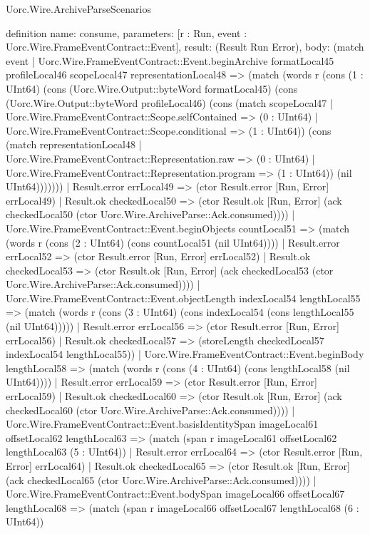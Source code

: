 \begin{lexlean}{Uorc.Wire.ArchiveParseScenarios}
\begin{semanticmodule}
definition{
  name: consume,
  parameters: [r : Run, event : Uorc.Wire.FrameEventContract::Event],
  result: (Result Run Error),
  body: (match event
    | Uorc.Wire.FrameEventContract::Event.beginArchive formatLocal45 profileLocal46 scopeLocal47 representationLocal48 => (match (words r (cons (1 : UInt64) (cons (Uorc.Wire.Output::byteWord formatLocal45) (cons (Uorc.Wire.Output::byteWord profileLocal46) (cons (match scopeLocal47
        | Uorc.Wire.FrameEventContract::Scope.selfContained => (0 : UInt64)
        | Uorc.Wire.FrameEventContract::Scope.conditional => (1 : UInt64)) (cons (match representationLocal48
        | Uorc.Wire.FrameEventContract::Representation.raw => (0 : UInt64)
        | Uorc.Wire.FrameEventContract::Representation.program => (1 : UInt64)) (nil UInt64)))))))
      | Result.error errLocal49 => (ctor Result.error [Run, Error] errLocal49)
      | Result.ok checkedLocal50 => (ctor Result.ok [Run, Error] (ack checkedLocal50 (ctor Uorc.Wire.ArchiveParse::Ack.consumed))))
    | Uorc.Wire.FrameEventContract::Event.beginObjects countLocal51 => (match (words r (cons (2 : UInt64) (cons countLocal51 (nil UInt64))))
      | Result.error errLocal52 => (ctor Result.error [Run, Error] errLocal52)
      | Result.ok checkedLocal53 => (ctor Result.ok [Run, Error] (ack checkedLocal53 (ctor Uorc.Wire.ArchiveParse::Ack.consumed))))
    | Uorc.Wire.FrameEventContract::Event.objectLength indexLocal54 lengthLocal55 => (match (words r (cons (3 : UInt64) (cons indexLocal54 (cons lengthLocal55 (nil UInt64)))))
      | Result.error errLocal56 => (ctor Result.error [Run, Error] errLocal56)
      | Result.ok checkedLocal57 => (storeLength checkedLocal57 indexLocal54 lengthLocal55))
    | Uorc.Wire.FrameEventContract::Event.beginBody lengthLocal58 => (match (words r (cons (4 : UInt64) (cons lengthLocal58 (nil UInt64))))
      | Result.error errLocal59 => (ctor Result.error [Run, Error] errLocal59)
      | Result.ok checkedLocal60 => (ctor Result.ok [Run, Error] (ack checkedLocal60 (ctor Uorc.Wire.ArchiveParse::Ack.consumed))))
    | Uorc.Wire.FrameEventContract::Event.basisIdentitySpan imageLocal61 offsetLocal62 lengthLocal63 => (match (span r imageLocal61 offsetLocal62 lengthLocal63 (5 : UInt64))
      | Result.error errLocal64 => (ctor Result.error [Run, Error] errLocal64)
      | Result.ok checkedLocal65 => (ctor Result.ok [Run, Error] (ack checkedLocal65 (ctor Uorc.Wire.ArchiveParse::Ack.consumed))))
    | Uorc.Wire.FrameEventContract::Event.bodySpan imageLocal66 offsetLocal67 lengthLocal68 => (match (span r imageLocal66 offsetLocal67 lengthLocal68 (6 : UInt64))
}
\end{semanticmodule}
\end{lexlean}

